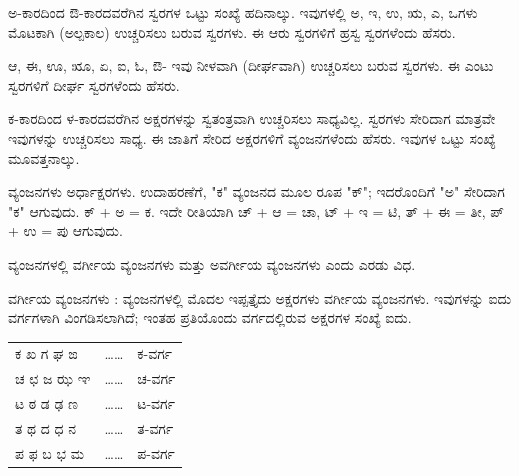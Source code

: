 \begin{kbvrule}
\noindent\kbvbullet\hspace{0.5em}ಅ-ಕಾರದಿಂದ ಔ-ಕಾರದವರೆಗಿನ ಸ್ವರಗಳ ಒಟ್ಟು ಸಂಖ್ಯೆ ಹದಿನಾಲ್ಕು. ಇವುಗಳಲ್ಲಿ ಅ, ಇ, ಉ, ಋ, ಎ, ಒಗಳು ಮೊಟಕಾಗಿ (ಅಲ್ಪಕಾಲ) ಉಚ್ಚರಿಸಲು ಬರುವ ಸ್ವರಗಳು. ಈ ಆರು ಸ್ವರಗಳಿಗೆ ಹ್ರಸ್ವ ಸ್ವರಗಳೆಂದು ಹೆಸರು.\par
\noindent\kbvbullet\hspace{0.5em}ಆ, ಈ, ಊ, ೠ, ಏ, ಐ, ಓ, ಔ- ಇವು ನೀಳವಾಗಿ (ದೀರ್ಘವಾಗಿ) ಉಚ್ಚರಿಸಲು ಬರುವ ಸ್ವರಗಳು. ಈ ಎಂಟು ಸ್ವರಗಳಿಗೆ ದೀರ್ಘ ಸ್ವರಗಳೆಂದು ಹೆಸರು.
\end{kbvrule}


\begin{kbvrule}
\noindent\kbvbullet\hspace{0.5em}ಕ-ಕಾರದಿಂದ ಳ-ಕಾರದವರೆಗಿನ ಅಕ್ಷರಗಳನ್ನು ಸ್ವತಂತ್ರವಾಗಿ ಉಚ್ಚರಿಸಲು ಸಾಧ್ಯವಿಲ್ಲ. ಸ್ವರಗಳು ಸೇರಿದಾಗ ಮಾತ್ರವೇ ಇವುಗಳನ್ನು ಉಚ್ಚರಿಸಲು ಸಾಧ್ಯ. ಈ ಜಾತಿಗೆ ಸೇರಿದ ಅಕ್ಷರಗಳಿಗೆ ವ್ಯಂಜನಗಳೆಂದು ಹೆಸರು. ಇವುಗಳ ಒಟ್ಟು ಸಂಖ್ಯೆ ಮೂವತ್ತನಾಲ್ಕು.\par
\noindent\kbvbullet\hspace{0.5em}ವ್ಯಂಜನಗಳು ಅರ್ಧಾಕ್ಷರಗಳು. ಉದಾಹರಣೆಗೆ, "ಕ" ವ್ಯಂಜನದ ಮೂಲ ರೂಪ "ಕ್"; ಇದರೊಂದಿಗೆ "ಅ" ಸೇರಿದಾಗ "ಕ" ಆಗುವುದು. ಕ್ + ಅ = ಕ. ಇದೇ ರೀತಿಯಾಗಿ ಚ್ + ಆ = ಚಾ, ಟ್ + ಇ = ಟಿ, ತ್ + ಈ = ತೀ, ಪ್ + ಉ = ಪು ಆಗುವುದು.\par
\noindent\kbvbullet\hspace{0.5em}ವ್ಯಂಜನಗಳಲ್ಲಿ ವರ್ಗೀಯ ವ್ಯಂಜನಗಳು ಮತ್ತು ಅವರ್ಗೀಯ ವ್ಯಂಜನಗಳು ಎಂದು ಎರಡು ವಿಧ.\par
\noindent\kbvbullet\hspace{0.5em}ವರ್ಗೀಯ ವ್ಯಂಜನಗಳು : ವ್ಯಂಜನಗಳಲ್ಲಿ ಮೊದಲ ಇಪ್ಪತ್ತೈದು ಅಕ್ಷರಗಳು ವರ್ಗೀಯ ವ್ಯಂಜನಗಳು. ಇವುಗಳನ್ನು ಐದು ವರ್ಗಗಳಾಗಿ ವಿಂಗಡಿಸಲಾಗಿದೆ; ಇಂತಹ ಪ್ರತಿಯೊಂದು ವರ್ಗದಲ್ಲಿರುವ ಅಕ್ಷರಗಳ ಸಂಖ್ಯೆ ಐದು.
\end{kbvrule}

\vspace{5pt plus 4pt minus 1pt}
\begin{center}
{\renewcommand{\arraystretch}{1.24}\setlength{\tabcolsep}{10pt}
\begin{tabular}{l c l}
ಕ ಖ ಗ ಘ ಙ & \ldots\ldots & ಕ-ವರ್ಗ \\
ಚ ಛ ಜ ಝ ಞ & \ldots\ldots & ಚ-ವರ್ಗ \\
ಟ ಠ ಡ ಢ ಣ & \ldots\ldots & ಟ-ವರ್ಗ \\
ತ ಥ ದ ಧ ನ & \ldots\ldots & ತ-ವರ್ಗ \\
ಪ ಫ ಬ ಭ ಮ & \ldots\ldots & ಪ-ವರ್ಗ \\
\end{tabular}}
\end{center}
\vspace{5pt plus 4pt minus 1pt}
